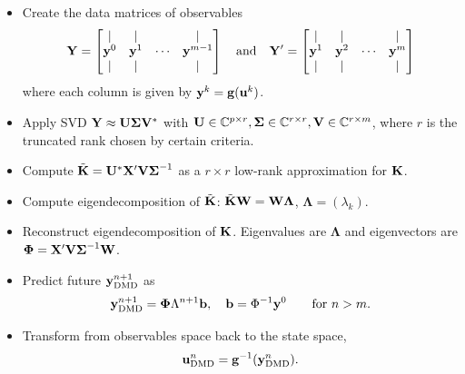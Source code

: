 \documentclass[10pt]{article}
\numberwithin{equation}{section}
\theoremstyle{plain}
\theoremstyle{remark}
\theoremstyle{remark}
\begin{document}
\begin{algorithm}
\caption{DMD algorithm on observable space~\cite{kutzbook}}
\begin{itemize}
\item[0.] Create the data matrices of observables
\begin{equation}\label{eq:2-14}
\bold Y = \begin{bmatrix}
|&|&&|\\
\bold y^0&\bold y^1&\cdots&\bold y^{m-1}\\
|&|&&|
\end{bmatrix} \quad\text{and}\quad
\bold Y' = \begin{bmatrix}
|&|&&|\\
\bold y^1&\bold y^2&\cdots&\bold y^{m}\\
|&|&&|
\end{bmatrix}
\end{equation}
where each column is given by $\bold y^k = \bold g(\bold u^k)$.
\item[1.] Apply SVD $\bold Y \approx \bold U\boldsymbol\Sigma \bold V^*$ with $\bold U \in \mathbb C^{p\times r}, \boldsymbol\Sigma \in \mathbb C^{r\times r}, \bold V\in \mathbb C^{r\times m}$, where $r$ is the truncated rank chosen by certain criteria.
\item [2.] Compute $\tilde{\bold K}=\bold U^*\bold X'\bold V\boldsymbol\Sigma^{-1}$ as a $r\times r$ low-rank approximation for $\bold K$.
\item [3.] Compute eigendecomposition of $\tilde{\bold K}$: $\tilde{\bold K} \bold W = \bold W\boldsymbol\Lambda$, $\boldsymbol\Lambda = (\lambda_k)$.
\item [4.] Reconstruct eigendecomposition of $\bold K$. Eigenvalues are $\boldsymbol \Lambda$ and eigenvectors are $\boldsymbol\Phi  = \bold X'\bold V\boldsymbol\Sigma^{-1}\bold W$.
\item [5.] Predict future $\bold y_\text{DMD}^{n+1}$ as
\begin{equation}\label{eq:2-15}
\bold y_\text{DMD}^{n+1} = \boldsymbol\Phi\Lambda^{n+1} \bold b, \quad \bold b = \Phi^{-1}\bold y^0 \qquad\mbox{for}\  n>m.
\end{equation}
\item [6.] Transform from observables space back to the state space,
\begin{equation}\label{eq:2-16}
\bold u_\text{DMD}^n =\bold g^{-1}(\bold y_\text{DMD}^n).
\end{equation}
\end{itemize}
\label{algorithm:phy_dmd}
\end{algorithm}
\end{document}
